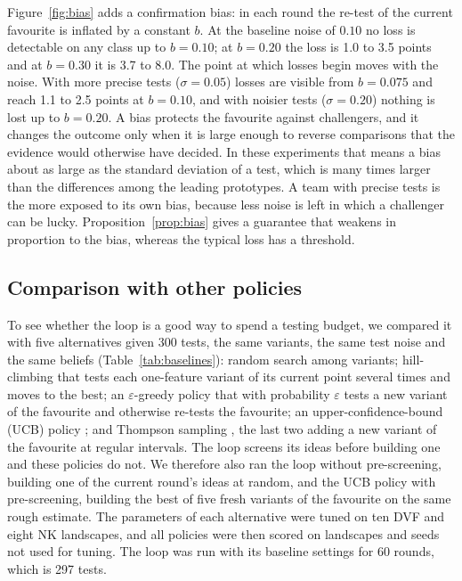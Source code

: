 \documentclass[10pt,twocolumn]{article}
\theoremstyle{definition}
\begin{document}
Figure~\ref{fig:bias} adds a confirmation bias: in each round the re-test of the current favourite is inflated by a constant $b$. At the baseline noise of $0.10$ no loss is detectable on any class up to $b=0.10$; at $b=0.20$ the loss is 1.0 to 3.5 points and at $b=0.30$ it is 3.7 to 8.0. The point at which losses begin moves with the noise. With more precise tests ($\sigma=0.05$) losses are visible from $b=0.075$ and reach 1.1 to 2.5 points at $b=0.10$, and with noisier tests ($\sigma=0.20$) nothing is lost up to $b=0.20$. A bias protects the favourite against challengers, and it changes the outcome only when it is large enough to reverse comparisons that the evidence would otherwise have decided. In these experiments that means a bias about as large as the standard deviation of a test, which is many times larger than the differences among the leading prototypes. A team with precise tests is the more exposed to its own bias, because less noise is left in which a challenger can be lucky. Proposition~\ref{prop:bias} gives a guarantee that weakens in proportion to the bias, whereas the typical loss has a threshold.

\subsection{Comparison with other policies}
\label{sec:baselines}

To see whether the loop is a good way to spend a testing budget, we compared it with five alternatives given 300 tests, the same variants, the same test noise and the same beliefs (Table~\ref{tab:baselines}): random search among variants; hill-climbing that tests each one-feature variant of its current point several times and moves to the best; an $\varepsilon$-greedy policy that with probability $\varepsilon$ tests a new variant of the favourite and otherwise re-tests the favourite; an upper-confidence-bound (UCB) policy \citep{auer2002}; and Thompson sampling \citep{russo2018}, the last two adding a new variant of the favourite at regular intervals. The loop screens its ideas before building one and these policies do not. We therefore also ran the loop without pre-screening, building one of the current round's ideas at random, and the UCB policy with pre-screening, building the best of five fresh variants of the favourite on the same rough estimate. The parameters of each alternative were tuned on ten DVF and eight NK landscapes, and all policies were then scored on landscapes and seeds not used for tuning. The loop was run with its baseline settings for 60 rounds, which is 297 tests.
\end{document}
